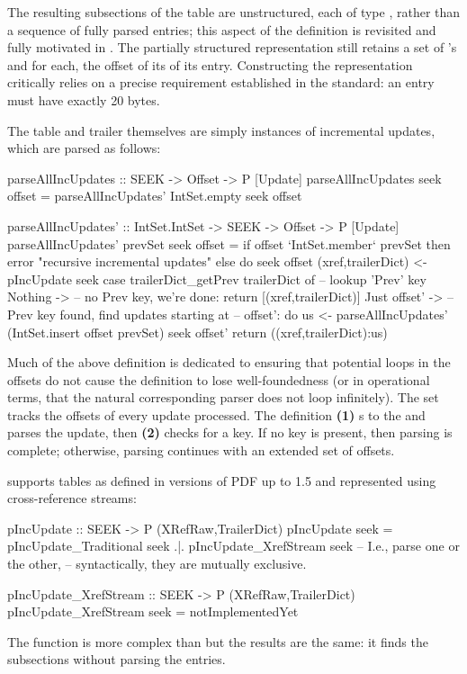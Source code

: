 The resulting subsections of the \xref{} table are unstructured, each of type , rather than a sequence of fully parsed \xref{} entries;
%
this aspect of the definition is revisited and fully motivated in .
%
The partially structured representation still retains a set of \objid{}'s and for each, the offset of its of its \xref{} entry.
%
Constructing the representation critically relies on a precise requirement established in the standard: an \xref{} entry must have exactly 20 bytes.

The \xref{} table and trailer themselves are simply instances of incremental updates, which are parsed as follows:
\lstset{numbers=right}
\begin{code}
parseAllIncUpdates :: SEEK -> Offset -> P [Update]
parseAllIncUpdates seek offset =
  parseAllIncUpdates' IntSet.empty seek offset

parseAllIncUpdates' :: IntSet.IntSet -> SEEK -> Offset -> P [Update]
parseAllIncUpdates' prevSet seek offset =
    if offset `IntSet.member` prevSet then
      error "recursive incremental updates"
    else
      do
      seek offset
      (xref,trailerDict) <- pIncUpdate seek
      case trailerDict_getPrev trailerDict of   -- lookup 'Prev' key
        Nothing      -> -- no Prev key, we're done:
                        return [(xref,trailerDict)]
        Just offset' -> -- Prev key found, find updates starting at
                        -- offset':
                        do
                        us <- parseAllIncUpdates'
                                (IntSet.insert offset prevSet)
                                seek
                                offset'
                        return ((xref,trailerDict):us)
\end{code}
\lstset{numbers=none}
%
Much of the above definition is dedicated to ensuring that potential loops in the  offsets do not cause the definition to lose well-foundedness (or in operational terms, that the natural corresponding parser does not loop infinitely).
%
The set  tracks the offsets of every update processed.
%
The definition %
\textbf{(1)} s to the  and parses the update, then 
\textbf{(2)} checks for a  key.
%
If no key is present, then parsing is complete;
%
otherwise, parsing continues with an extended set of offsets.

 supports \xref{} tables as defined in versions of PDF up to 1.5 and represented using cross-reference streams:
\begin{code}
pIncUpdate :: SEEK -> P (XRefRaw,TrailerDict)
pIncUpdate seek =
      pIncUpdate_Traditional seek
  .|. pIncUpdate_XrefStream seek
      -- I.e., parse one or the other,
      -- syntactically, they are mutually exclusive.

pIncUpdate_XrefStream :: SEEK -> P (XRefRaw,TrailerDict)
pIncUpdate_XrefStream seek = notImplementedYet
\end{code}
%
The function  is more
complex than  but the results
are the same: it finds the subsections
without parsing the \xref{} entries.

